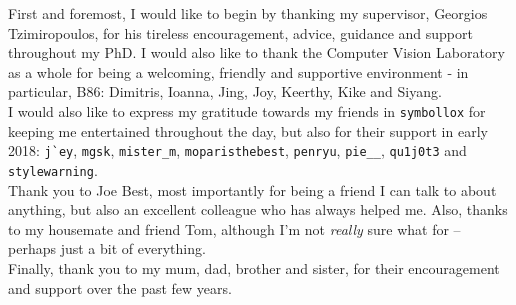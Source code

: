 
\begin{acknowledgements}

  First and foremost, I would like to begin by thanking my supervisor,
  Georgios Tzimiropoulos, for his tireless encouragement, advice,
  guidance and support throughout my PhD. I would also like to thank
  the Computer Vision Laboratory as a whole for being a welcoming,
  friendly and supportive environment - in particular, B86: Dimitris,
  Ioanna, Jing, Joy, Keerthy, Kike and Siyang.
  \\ [0.3em]

  \noindent I would also like to express my gratitude towards my
  friends in \verb|symbollox| for keeping me entertained throughout
  the day, but also for their support in early 2018: \verb|j`ey|,
  \verb|mgsk|, \verb|mister_m|, \verb|moparisthebest|, \verb|penryu|,
  \verb|pie__|, \verb|qu1j0t3| and \verb|stylewarning|.
  \\ [0.3em]

  \noindent Thank you to Joe Best, most importantly for being a friend
  I can talk to about anything, but also an excellent colleague who
  has always helped me. Also, thanks to my housemate and friend Tom,
  although I'm not \textit{really} sure what for -- perhaps just a bit
  of everything.
  \\ [0.3em]

  \noindent Finally, thank you to my mum, dad, brother and sister, for
  their encouragement and support over the past few years.



\end{acknowledgements}

